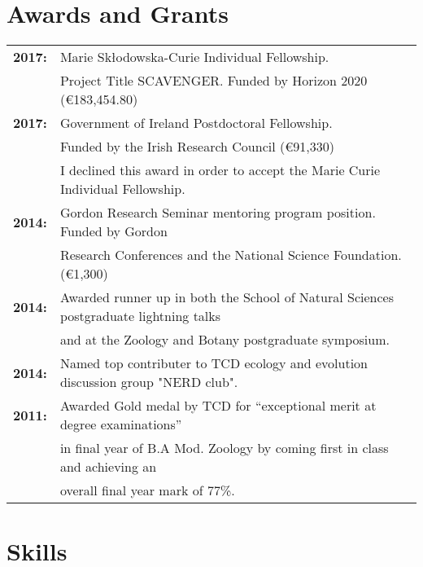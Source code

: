 \documentclass[10pt,a4paper]{article}
\begin{document}

\section{Awards and Grants}


\begin{tabular}{ll}
\textbf{2017:} & Marie Skłodowska-Curie Individual Fellowship.\\
& Project Title SCAVENGER. Funded by Horizon 2020 (\euro 183,454.80)\\
\textbf{2017:} & Government of Ireland Postdoctoral Fellowship.\\
& Funded by the Irish Research Council (\euro 91,330)\\
& I declined this award in order to accept the Marie Curie Individual Fellowship.\\
\textbf{2014:} & Gordon Research Seminar mentoring program position. Funded by Gordon\\
& Research Conferences and the National Science Foundation. (\euro 1,300)\\
\textbf{2014:} & Awarded runner up in both the School of Natural Sciences postgraduate lightning talks\\
& and at the Zoology and Botany postgraduate symposium.\\
\textbf{2014:} & Named top contributer to TCD ecology and evolution discussion group "NERD club".\\
\textbf{2011:} & Awarded Gold medal by TCD for “exceptional merit at degree examinations”\\
& in final year of B.A Mod. Zoology by coming first in class and achieving an\\
& overall final year mark of 77\%.\\
\end{tabular}

\bigskip


\clearpage
\bigskip
\section{Skills}
\end{document}
